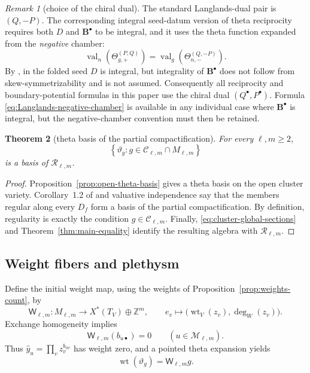 \documentclass[11pt]{amsart}
\newtheorem{theorem}{Theorem}[section]
\theoremstyle{definition}
\theoremstyle{remark}
\newtheorem{remark}[theorem]{Remark}
\newcommand{\cR}{\mathcal R}
\newcommand{\wt}{\operatorname{wt}}
\begin{document}
\begin{remark}[choice of the chiral dual]
\label{rem:chiral-versus-Langlands}
The standard Langlands-dual pair is $(Q,-P)$.  The corresponding integral
seed-datum version of theta reciprocity requires both $D$ and
$\mathbf B^{\bullet}$ to be integral, and it uses the theta function
expanded from the \emph{negative} chamber:
\begin{equation}
 \operatorname{val}_{n}(\Theta_{g,+}^{(P,Q)})
 =\operatorname{val}_{g}(\Theta_{n,-}^{(Q,-P)}).
 \label{eq:Langlands-negative-chamber}
\end{equation}
By \cite[Corollary~4.20]{CMMM}, in the folded seed $D$ is integral,
but integrality of $\mathbf B^{\bullet}$ does not follow from
skew-symmetrizability and is not assumed.  Consequently all reciprocity and
boundary-potential formulas in this paper use the chiral dual
$(Q^{\bullet},P^{\bullet})$.  Formula
\eqref{eq:Langlands-negative-chamber} is available in any individual case
where $\mathbf B^{\bullet}$ is integral, but the negative-chamber
convention must then be retained.
\end{remark}

\begin{theorem}[theta basis of the partial compactification]
\label{thm:theta-basis}
For every $\ell,m\ge2$,
\[ \left\{\vartheta_g: g\in\mathscr C_{\ell,m}\cap M_{\ell,m}\right\} \]
is a basis of $\cR_{\ell,m}$.
\end{theorem}

\begin{proof}
Proposition~\ref{prop:open-theta-basis} gives a theta basis on the open
cluster variety.  Corollary~1.2 of \cite{CMMM} and valuative independence
say that the members regular along every $D_f$ form a basis of the partial
compactification.  By definition, regularity is exactly the condition
$g\in\mathscr C_{\ell,m}$.  Finally,
\eqref{eq:cluster-global-sections} and Theorem~\ref{thm:main-equality}
identify the resulting algebra with $\cR_{\ell,m}$.
\end{proof}

\subsection{Weight fibers and plethysm}

Define the initial weight map, using the weights of
Proposition~\ref{prop:weights-count}, by
\[ \mathsf W_{\ell,m}:M_{\ell,m} \longrightarrow X^*(T_V)\oplus\mathbb Z^m, \qquad e_v\longmapsto\bigl(\wt_V(z_v),\deg_W(z_v)\bigr). \]
Exchange homogeneity implies
\[ \mathsf W_{\ell,m}(b_{u\bullet})=0 \qquad(u\in\mathscr M_{\ell,m}). \]
Thus $\widehat y_u=\prod_vz_v^{b_{uv}}$ has weight zero, and a pointed
theta expansion yields
\begin{equation}
 \wt(\vartheta_g)=\mathsf W_{\ell,m}g.
 \label{eq:theta-weight}
\end{equation}
\end{document}
